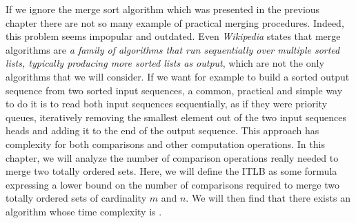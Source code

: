 \label{tree:merging:intro}

If we ignore the merge sort algorithm which was presented in
the previous chapter there are not so many example of practical merging
procedures. Indeed, this problem seems impopular and outdated. Even
\emph{Wikipedia} states that merge algorithms are \emph{a family of algorithms
that run sequentially over multiple sorted lists, typically producing more
sorted lists as output}, which are not the only algorithms that we will
consider. If we want for example to build a sorted output sequence from two
sorted input sequences, a common, practical and simple way to do it is to read
both input sequences sequentially, as if they were priority queues, iteratively
removing the smallest element out of the two input sequences heads and adding
it to the end of the output sequence. This approach has  complexity for
both comparisons and other computation operations. In this chapter, we will
analyze the number of comparison operations really needed to merge two totally
ordered sets. Here, we will define the ITLB as some formula expressing a lower
bound on the number of comparisons required to merge two totally ordered sets
of cardinality $m$ and $n$. We will then find that there exists an algorithm
whose time complexity is .

